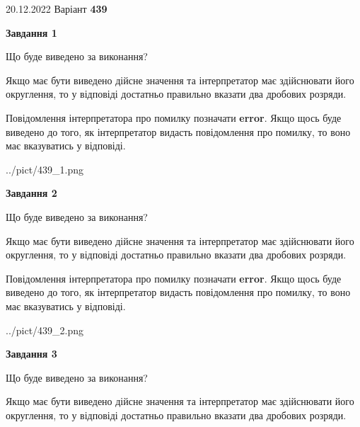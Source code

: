 \documentclass[12pt, ukrainian]{article}
\begin{document}
{20.12.2022 Варіант \No \textbf { 439 }\par}
{
\begin {Large}

{\begin {center}\textbf{Завдання 1}\end {center}}\par
Що буде виведено за виконання? \par

Якщо має бути виведено дійсне значення та інтерпретатор має здійснювати його округлення, 
то у відповіді достатньо правильно вказати два дробових розряди.

Повідомлення інтерпретатора про помилку позначати \textbf{error}.
Якщо щось буде виведено до того, як інтерпретатор видасть повідомлення про помилку, 
то воно має вказуватись у відповіді. \par

\begin{center}
	{../pict/439_1.png}
\end{center}
\newpage

{\begin {center}\textbf{Завдання 2}\end {center}}\par
Що буде виведено за виконання? \par

Якщо має бути виведено дійсне значення та інтерпретатор має здійснювати його округлення, 
то у відповіді достатньо правильно вказати два дробових розряди.

Повідомлення інтерпретатора про помилку позначати \textbf{error}.
Якщо щось буде виведено до того, як інтерпретатор видасть повідомлення про помилку, 
то воно має вказуватись у відповіді. \par

\begin{center}
	{../pict/439_2.png}
\end{center}
\newpage

{\begin {center}\textbf{Завдання 3}\end {center}}\par
Що буде виведено за виконання? \par

Якщо має бути виведено дійсне значення та інтерпретатор має здійснювати його округлення, 
то у відповіді достатньо правильно вказати два дробових розряди.


\end{Large}}
\end{document}
